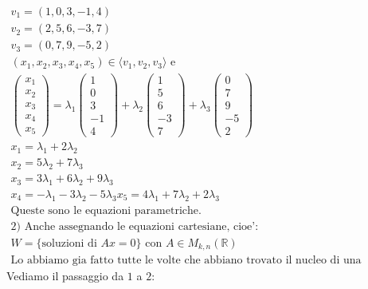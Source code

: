 \documentclass[a4paper,12pt]{article}
\begin{document}
\begin{align*}
    v_1=(1,0,3,-1,4) \\
    v_2=(2,5,6,-3,7) \\
    v_3=(0,7,9,-5,2) \\
    (x_1,x_2,x_3,x_4,x_5) \in \langle v_1,v_2,v_3 \rangle \text{ e } \\
    \begin{pmatrix}
        x_1 \\ x_2 \\ x_3 \\ x_4 \\ x_5
    \end{pmatrix}
    = \lambda_1 \begin{pmatrix}
        1 \\ 0 \\ 3 \\ -1 \\ 4
    \end{pmatrix}
    + \lambda_2 \begin{pmatrix}
        1 \\ 5 \\6 \\-3 \\7
    \end{pmatrix}
    + \lambda_3 \begin{pmatrix}
        0 \\ 7 \\ 9 \\-5\\2
    \end{pmatrix} \\
    x_1=\lambda_1+2\lambda_2 \\
    x_2=5\lambda_2+7\lambda_3 \\
    x_3=3\lambda_1+6\lambda_2+9\lambda_3 \\
    x_4= -\lambda_1 - 3\lambda_2 -5\lambda_3
    x_5= 4\lambda_1+7\lambda_2 +2\lambda_3 \\
    \text{Queste sono le equazioni parametriche.} \\
    \text{2) Anche assegnando le equazioni cartesiane, cioe':} \\
    W=\{\text{soluzioni di }Ax=0\} \text{ con } A \in M_{k,n}(\mathbb{R}) \\
    \text{Lo abbiamo gia fatto tutte le volte che abbiano trovato il nucleo di una applicazione lineare.}
\end{align*}
Vediamo il passaggio da $1$ a $2$:
\end{document}
